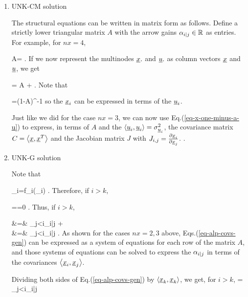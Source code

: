 \begin{enumerate}
\item UNK-CM solution

The structural equations can be
written in matrix form
as follows.
Define a strictly lower triangular
matrix $A$
with the arrow gains $\alpha_{i|j}\in { \mathbb{R}}$
as entries.
For example, for $nx=4$,

\beq
A=
\;.
\eeq
If we now represent the multinodes
$\rvx.$ and $\rvu.$ as column vectors
$\rvx$ and $\rvu$, we get

\beq
\rvx = A \rvx +\rvu
\label{eq-mat-fully-conn}
\;.
\eeq
Note that

\beq
\rvx=(1-A)^{-1}\rvu
\label{eq-x-one-minus-a-u}
\eeq
so the $\rvx_i$ can be expressed 
in terms of the $\rvu_i$. 

Just like we did for the
case $nx=3$, we can now
use Eq.(\ref{eq-x-one-minus-a-u}) to
express,
in terms of $A$ and the $\av{\rvu_i, \rvu_i}=
\s^2_{\rvu_i}$, the covariance
matrix $C=\av{\rvx, \rvx^T}$
and the Jacobian matrix 
$J$ with $J_{i,j}=\pder{\rvx_i}{\rvx_j}$.
. 

\item UNK-G solution

Note that

\beq
\rvx_i=f_i(\rvu_{\leq i})
\;.
\eeq
Therefore,
if $i>k$,

\beq
{}
==0
\;.
\eeq
Thus, if $i>k$, 

\beqa
{}&=&
\sum_{j<i}\alp_{i|j}
+
\\
&=&
\sum_{j<i}\alp_{i|j}
\;.
\label{eq-alp-covs-gen}
\eeqa
As shown for the cases $nx=2, 3$
above,
Eqs.(\ref{eq-alp-covs-gen}) can be 
expressed as a system of equations
for each row of the matrix $A$,
and those systems of equations can be 
solved to express the $\alpha_{i|j} $
in terms of the covariances $\av{\rvx_i, \rvx_j}$.

Dividing both sides of 
Eq.(\ref{eq-alp-covs-gen}) by $\av{\rvx_k, \rvx_k}$, we get, for $i>k$,
\beq
{}=
\sum_{j<i}\alp_{i|j}
\label{eq-alp-jacobian-gen}
\eeq


\end{enumerate}

